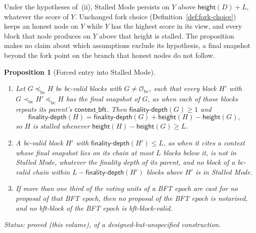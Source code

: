 \documentclass[11pt,a4paper]{article}
\newtheorem{proposition}[theorem]{Proposition}
\theoremstyle{definition}
\newcommand{\bc}{\mathrm{bc}}
\newcommand{\Origin}{\mathcal{O}}
\newcommand{\Obc}{\Origin_{\bc}}
\newcommand{\preceqbc}{\preceq_{\bc}}
\newcommand{\precbc}{\prec_{\bc}}
\newcommand{\contextbft}{\mathsf{context\_bft}}
\newcommand{\finalitydepth}{\mathsf{finality\text{-}depth}}
\begin{document}
Under the hypotheses of~(ii), Stalled Mode persists on $Y$ above
$\mathsf{height}(D) + L$, whatever the score of $Y$. Unchanged fork choice
(Definition~\ref{def:fork-choice}) keeps an honest node on $Y$ while $Y$ has
the highest score in its view, and every block that node produces on $Y$
above that height is stalled. The proposition makes no claim about which
assumptions exclude its hypothesis, a final snapshot beyond the fork point on
the branch that honest nodes do not follow.

\begin{proposition}[Forced entry into Stalled Mode]\label{prop:forced-entry}
\begin{enumerate}[label=(\roman*)]
\item Let $G \preceqbc H$ be bc-valid blocks with $G \neq \Obc$, such that
  every block $H'$ with $G \precbc H' \preceqbc H$ has the final snapshot of
  $G$, as when each of those blocks repeats its parent's $\contextbft$. Then
  $\finalitydepth(G) \ge 1$ and
  \[
    \finalitydepth(H) = \finalitydepth(G) + \mathsf{height}(H) -
    \mathsf{height}(G),
  \]
  so $H$ is stalled whenever $\mathsf{height}(H) - \mathsf{height}(G) \ge L$.
\item A bc-valid block $H'$ with $\finalitydepth(H') \le L$, as when it cites
  a context whose final snapshot lies on its chain at most $L$ blocks below
  it, is not in Stalled Mode, whatever the finality depth of its parent, and
  no block of a bc-valid chain within $L - \finalitydepth(H')$ blocks above
  $H'$ is in Stalled Mode.
\item If more than one third of the voting units of a BFT epoch are cast for
  no proposal of that BFT epoch, then no proposal of the BFT epoch is
  notarised, and no bft-block of the BFT epoch is bft-block-valid.
\end{enumerate}

Status: proved (this volume), of a designed-but-unspecified construction.
\end{proposition}
\end{document}
